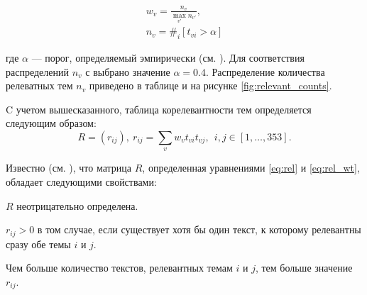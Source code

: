 \documentclass[12pt]{article}
\newenvironment{itemize*}%
{\begin{itemize}%
	\setlength{\itemsep}{0pt}%
	\setlength{\parskip}{0pt}}%
{\end{itemize}}
\begin{document}
\begin{equation}
	\begin{gathered}
		w_{v} = \frac{n_v}{\max_{v'} n_{v'}}, \\
		n_v = \#_i[t_{vi} > \alpha]
	\end{gathered}
	\label{eq:rel_wt}
\end{equation}

где $\alpha$ --- порог, определяемый эмпирически (см. \cite{Chernyak_2015}). Для соответствия распределений $n_v$ с \cite{mirkin2018preprint} выбрано значение $\alpha=0.4$. Распределение количества релеватных тем $n_v$ приведено в таблице и на рисунке \ref{fig:relevant_counts}.

C учетом вышесказанного, таблица корелевантности тем определяется следующим образом:
\begin{equation}
	R = (r_{ij}), \  r_{ij} = \sum_{v} w_{v} t_{vi} t_{vj}, \ \ i,j\in[1,\ldots, 353].
	\label{eq:rel}
\end{equation}

Известно (см. \cite{MirkinChernyak2012}), что матрица $R$, определенная уравнениями \eqref{eq:rel} и \eqref{eq:rel_wt}, обладает следующими свойствами:

\begin{itemize*}
	\item $R$ неотрицательно определена.
	\item $r_{ij}>0$ в том случае, если существует хотя бы один текст, к которому релевантны сразу обе темы $i$ и $j$.
	\item Чем больше количество текстов, релевантных темам $i$ и $j$, тем больше значение $r_{ij}$.
\end{itemize*}
\end{document}
